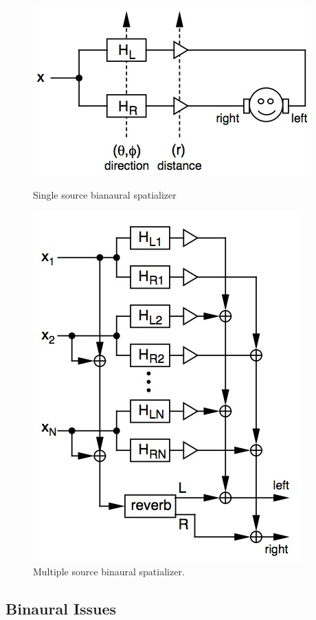 \begin{figure}[htbp4]
  \begin{minipage}[b]{.45\linewidth}
    \centering
    \includegraphics[width=.8\linewidth]{images/binaural_spatializer.jpg}
    \caption{Single source bianaural spatializer}
    \label{fig:binaural_spatializer}
  \end{minipage}
  \hspace{0.5cm}
  \begin{minipage}[b]{0.5\linewidth}
    \centering
  \includegraphics[width=.5\linewidth]{images/binaural_spatializers.jpg}
    \caption{Multiple source binaural spatializer.}
    \label{fig:binaural_spatializers}
  \end{minipage}
\end{figure}


\subsection{                  Binaural Issues                                 }

